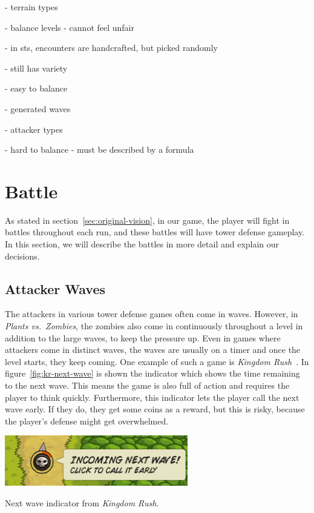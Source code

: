 - terrain types

- balance levels - cannot feel unfair

- in sts, encounters are handcrafted, but picked randomly

- still has variety

- easy to balance

- generated waves

- attacker types

- hard to balance - must be described by a formula

\section{Battle}

As stated in section~\ref{sec:original-vision}, in our game, the player will fight in battles throughout each run, and these battles will have tower defense gameplay.
In this section, we will describe the battles in more detail and explain our decisions.

\subsection{Attacker Waves}

The attackers in various tower defense games often come in waves.
However, in \emph{Plants vs.\ Zombies}, the zombies also come in continuously throughout a level in addition to the large waves, to keep the pressure up.
Even in games where attackers come in distinct waves, the waves are usually on a timer and once the level starts, they keep coming.
One example of such a game is \emph{Kingdom Rush}~\cite{kingdomRush}.
In figure~\ref{fig:kr-next-wave} is shown the indicator which shows the time remaining to the next wave.
This means the game is also full of action and requires the player to think quickly.
Furthermore, this indicator lets the player call the next wave early.
If they do, they get some coins as a reward, but this is risky, because the player's defense might get overwhelmed.

\begin{center}
    \captionsetup{type=figure}
    \includegraphics[width=0.6\textwidth]{img/Kingdom-Rush-Next-Wave-Detail.png}
    \caption{Next wave indicator from \emph{Kingdom Rush}.}
    \label{fig:kr-next-wave}
\end{center}

